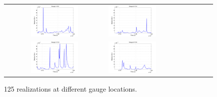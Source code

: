 \begin{figure}[h]
\centering
\begin{tabular}{clc}        
\includegraphics[width=0.5\textwidth]{./figures/error_gauge1.pdf} &
\includegraphics[width=0.5\textwidth]{./figures/error_gauge2.pdf} \\
\includegraphics[width=0.5\textwidth]{./figures/error_gauge3.pdf} &
\includegraphics[width=0.5\textwidth]{./figures/error_gauge4.pdf} 

\end{tabular}
\caption{125 \geoclaw realizations at different gauge locations.}
\label{fig:error}
\end{figure}   
